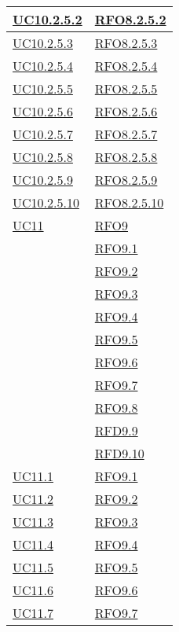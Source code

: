 \begin{longtable}{|>{\centering}m{5cm}|m{5cm}<{\centering}|}
\hyperlink{UC10.2.5.2}{UC10.2.5.2} & \hyperlink{RFO8.2.5.2}{RFO8.2.5.2}\\\hline
\hyperlink{UC10.2.5.3}{UC10.2.5.3} & \hyperlink{RFO8.2.5.3}{RFO8.2.5.3}\\\hline
\hyperlink{UC10.2.5.4}{UC10.2.5.4} & \hyperlink{RFO8.2.5.4}{RFO8.2.5.4}\\\hline
\hyperlink{UC10.2.5.5}{UC10.2.5.5} & \hyperlink{RFO8.2.5.5}{RFO8.2.5.5}\\\hline
\hyperlink{UC10.2.5.6}{UC10.2.5.6} & \hyperlink{RFO8.2.5.6}{RFO8.2.5.6}\\\hline
\hyperlink{UC10.2.5.7}{UC10.2.5.7} & \hyperlink{RFO8.2.5.7}{RFO8.2.5.7}\\\hline
\hyperlink{UC10.2.5.8}{UC10.2.5.8} & \hyperlink{RFO8.2.5.8}{RFO8.2.5.8}\\\hline
\hyperlink{UC10.2.5.9}{UC10.2.5.9} & \hyperlink{RFO8.2.5.9}{RFO8.2.5.9}\\\hline
\hyperlink{UC10.2.5.10}{UC10.2.5.10} & \hyperlink{RFO8.2.5.10}{RFO8.2.5.10}\\\hline
\hyperlink{UC11}{UC11} & \hyperlink{RFO9}{RFO9}\\\hline
& \hyperlink{RFO9.1}{RFO9.1}\\
& \hyperlink{RFO9.2}{RFO9.2}\\
& \hyperlink{RFO9.3}{RFO9.3}\\
& \hyperlink{RFO9.4}{RFO9.4}\\
& \hyperlink{RFO9.5}{RFO9.5}\\
& \hyperlink{RFO9.6}{RFO9.6}\\
& \hyperlink{RFO9.7}{RFO9.7}\\
& \hyperlink{RFO9.8}{RFO9.8}\\
& \hyperlink{RFD9.9}{RFD9.9}\\
& \hyperlink{RFD9.10}{RFD9.10}\\\hline
\hyperlink{UC11.1}{UC11.1} & \hyperlink{RFO9.1}{RFO9.1}\\\hline
\hyperlink{UC11.2}{UC11.2} & \hyperlink{RFO9.2}{RFO9.2}\\\hline
\hyperlink{UC11.3}{UC11.3} & \hyperlink{RFO9.3}{RFO9.3}\\\hline
\hyperlink{UC11.4}{UC11.4} & \hyperlink{RFO9.4}{RFO9.4}\\\hline
\hyperlink{UC11.5}{UC11.5} & \hyperlink{RFO9.5}{RFO9.5}\\\hline
\hyperlink{UC11.6}{UC11.6} & \hyperlink{RFO9.6}{RFO9.6}\\\hline
\hyperlink{UC11.7}{UC11.7} & \hyperlink{RFO9.7}{RFO9.7}\\\hline

\end{longtable}
